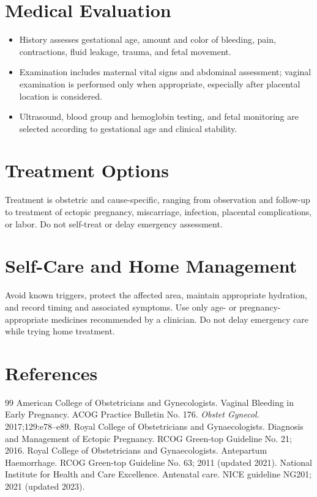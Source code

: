 \section*{Medical Evaluation}
\begin{itemize}
  \item History assesses gestational age, amount and color of bleeding, pain, contractions, fluid leakage, trauma, and fetal movement.
  \item Examination includes maternal vital signs and abdominal assessment; vaginal examination is performed only when appropriate, especially after placental location is considered.
  \item Ultrasound, blood group and hemoglobin testing, and fetal monitoring are selected according to gestational age and clinical stability.
\end{itemize}

\section*{Treatment Options}
Treatment is obstetric and cause-specific, ranging from observation and follow-up to treatment of ectopic pregnancy, miscarriage, infection, placental complications, or labor. Do not self-treat or delay emergency assessment.

\section*{Self-Care and Home Management}
Avoid known triggers, protect the affected area, maintain appropriate hydration, and record timing and associated symptoms. Use only age- or pregnancy-appropriate medicines recommended by a clinician. Do not delay emergency care while trying home treatment.

\section*{References}
\begin{thebibliography}{99}
 American College of Obstetricians and Gynecologists. Vaginal Bleeding in Early Pregnancy. ACOG Practice Bulletin No. 176. \textit{Obstet Gynecol}. 2017;129:e78--e89.
 Royal College of Obstetricians and Gynaecologists. Diagnosis and Management of Ectopic Pregnancy. RCOG Green-top Guideline No. 21; 2016.
 Royal College of Obstetricians and Gynaecologists. Antepartum Haemorrhage. RCOG Green-top Guideline No. 63; 2011 (updated 2021).
 National Institute for Health and Care Excellence. Antenatal care. NICE guideline NG201; 2021 (updated 2023).
\end{thebibliography}
